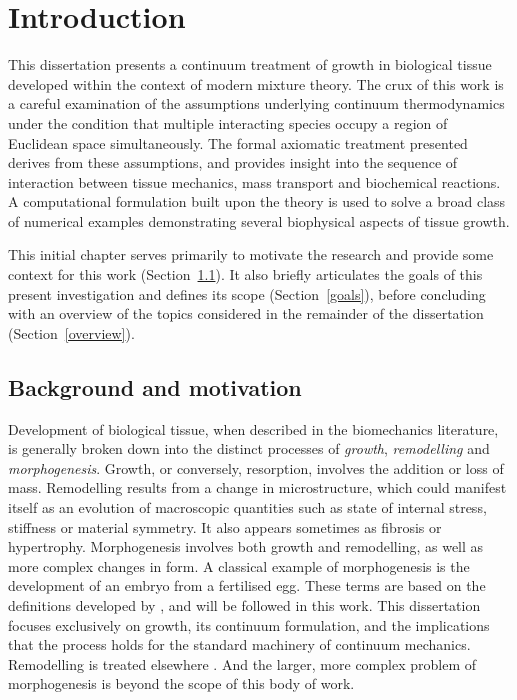 \chapter{Introduction}
\label{introduction}

This dissertation presents a continuum treatment of growth in
biological tissue developed within the context of modern mixture
theory. The crux of this work is a careful examination of the
assumptions underlying continuum thermodynamics under the condition
that multiple interacting species occupy a region of Euclidean space
simultaneously. The formal axiomatic treatment presented derives from
these assumptions, and provides insight into the sequence of
interaction between tissue mechanics, mass transport and biochemical
reactions. A computational formulation built upon the theory is used
to solve a broad class of numerical examples demonstrating several
biophysical aspects of tissue growth.

This initial chapter serves primarily to motivate the research and
provide some context for this work (Section~\ref{background}). It also
briefly articulates the goals of this present investigation and
defines its scope (Section~\ref{goals}), before concluding with an
overview of the topics considered in the remainder of the dissertation
(Section~\ref{overview}).

\section{Background and motivation}
\label{background}

Development of biological tissue, when described in the biomechanics
literature, is generally broken down into the distinct processes of
\emph{growth}, \emph{remodelling} and \emph{morphogenesis}. Growth, or
conversely, resorption, involves the addition or loss of
mass. Remodelling results from a change in microstructure, which could
manifest itself as an evolution of macroscopic quantities such as
state of internal stress, stiffness or material symmetry. It also
appears sometimes as fibrosis or hypertrophy. Morphogenesis involves
both growth and remodelling, as well as more complex changes in
form. A classical example of morphogenesis is the development of an
embryo from a fertilised egg. These terms are based on the definitions
developed by \cite{Taber:95}, and will be followed in this work. This
dissertation focuses exclusively on growth, its continuum formulation,
and the implications that the process holds for the standard machinery
of continuum mechanics. Remodelling is treated elsewhere
\citep{remodelpaper}. And the larger, more complex problem of
morphogenesis is beyond the scope of this body of work.


